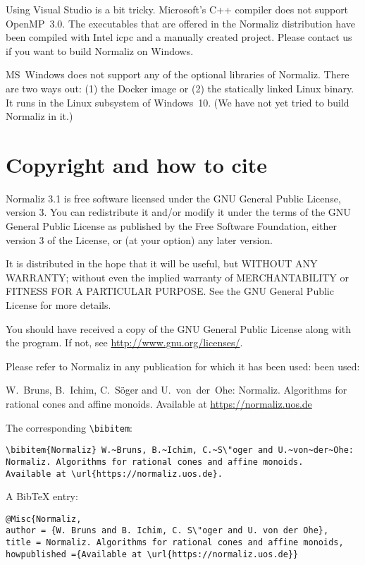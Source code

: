 \documentclass[12pt,a4paper]{scrartcl}
\theoremstyle{definition}
\begin{document}
Using Visual Studio is a bit tricky. Microsoft's C++ compiler does not support OpenMP~3.0. The executables that are offered in the Normaliz distribution have been compiled with Intel icpc and a manually created project. Please contact us if you want to build Normaliz on Windows.

MS~Windows does not support any of the optional libraries of Normaliz. There are two ways out: (1) the Docker image or (2) the statically linked Linux binary. It runs in the Linux subsystem of Windows~10. (We have not yet tried to build Normaliz in it.)

\section{Copyright and how to cite}

Normaliz 3.1 is free software licensed under the GNU General
Public License, version 3. You can redistribute it and/or
modify it under the terms of the GNU General Public License as
published by the Free Software Foundation, either version 3 of
the License, or (at your option) any later version.

It is distributed in the hope that it will be useful, but
WITHOUT ANY WARRANTY; without even the implied warranty of
MERCHANTABILITY or FITNESS FOR A PARTICULAR PURPOSE. See the
GNU General Public License for more details.

You should have received a copy of the GNU General Public
License along with the program. If not, see
\url{http://www.gnu.org/licenses/}.

Please refer to Normaliz in any publication for which it has
been used:
been used:
\begin{center}
	W.~Bruns, B.~Ichim, C.~S\"oger and U.~von~der~Ohe: Normaliz. Algorithms for
	rational cones and affine monoids. Available at
	\url{https://normaliz.uos.de}
\end{center}
The corresponding \verb|\bibitem|:
\begin{Verbatim}
\bibitem{Normaliz} W.~Bruns, B.~Ichim, C.~S\"oger and U.~von~der~Ohe:
Normaliz. Algorithms for rational cones and affine monoids.
Available at \url{https://normaliz.uos.de}.
\end{Verbatim}

A BibTeX entry:
\begin{Verbatim}
@Misc{Normaliz,
author = {W. Bruns and B. Ichim, C. S\"oger and U. von der Ohe},
title = Normaliz. Algorithms for rational cones and affine monoids,
howpublished ={Available at \url{https://normaliz.uos.de}}
\end{Verbatim}
\end{document}
